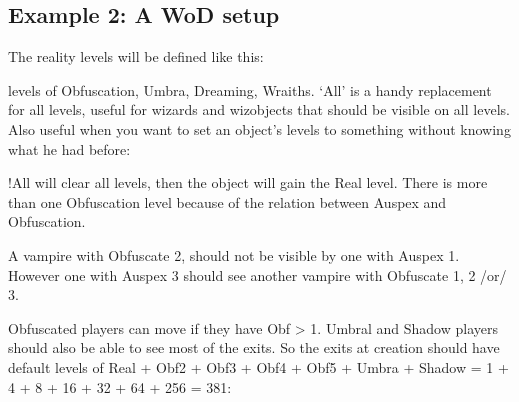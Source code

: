 \documentclass[letterpaper,10pt,english]{sphinxmanual}
\begin{document}
\subsection{Example 2: A WoD setup}
\label{\detokenize{advanced:example-2-a-wod-setup}}
\sphinxAtStartPar
The reality levels will be defined like this:

\begin{sphinxVerbatim}[commandchars=\\\{\}]
          
          
          
           
           
           
           
           
           
          
\end{sphinxVerbatim}

 levels of Obfuscation, Umbra, Dreaming, Wraiths. ‘All’ is a handy
replacement for all levels, useful for wizards and wizobjects that should
be visible on all levels. Also useful when you want to set an object’s
levels to something without knowing what he had before:

\begin{sphinxVerbatim}[commandchars=\\\{\}]
 
\end{sphinxVerbatim}

\sphinxAtStartPar
!All will clear all levels, then the object will gain the Real level.
There is more than one Obfuscation level because of the relation between
Auspex and Obfuscation.

\sphinxAtStartPar
A vampire with Obfuscate 2, should not be visible by one with Auspex 1.
However one with Auspex 3 should see another vampire with Obfuscate 1, 2
/or/ 3.

\sphinxAtStartPar
Obfuscated players can move if they have Obf \textgreater{} 1. Umbral and Shadow players
should also be able to see most of the exits. So the exits at creation
should have default levels of Real + Obf2 + Obf3 + Obf4 + Obf5 + Umbra +
Shadow = 1 + 4 + 8 + 16 + 32 + 64 + 256 = 381:
\end{document}
